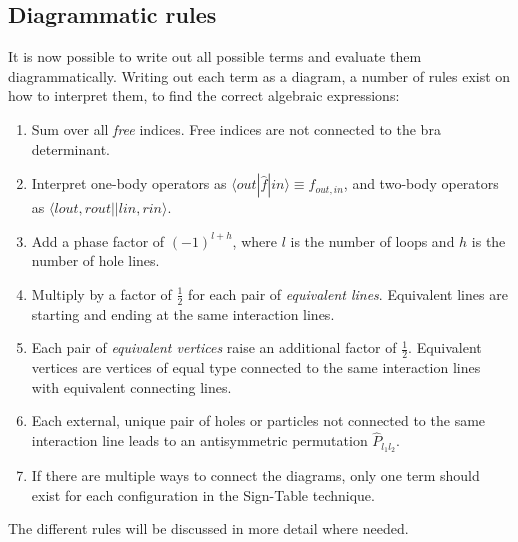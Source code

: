 \subsection{Diagrammatic rules}
It is now possible to write out all possible terms and evaluate them diagrammatically. 
Writing out each term as a diagram, a number of rules exist on how to interpret them, to find the correct algebraic expressions:
\begin{enumerate}
\item\label{ite:CC:sumFree} Sum over all \textit{free} indices. Free indices are not connected to the bra determinant.
\item\label{ite:CC:operators} Interpret one-body operators as $\langle out |\hat{f}| in \rangle \equiv f_{out,in}$, and two-body operators as $\langle lout,rout || lin,rin \rangle$.
\item\label{ite:CC:phase} Add a phase factor of $(-1)^{l+h}$, where $l$ is the number of loops and $h$ is the number of hole lines.
\item\label{ite:CC:equLines} Multiply by a factor of $\frac{1}{2}$ for each pair of \textit{equivalent lines}.
Equivalent lines are starting and ending at the same interaction lines.
\item\label{ite:CC:equVert} Each pair of \textit{equivalent vertices} raise an additional factor of $\frac{1}{2}$.
Equivalent vertices are vertices of equal type connected to the same interaction lines with equivalent connecting lines.
\item\label{ite:CC:permut} Each external, unique pair of holes or particles not connected to the same interaction line leads to an antisymmetric permutation $\hat{P}_{l_1 l_2}$.
\item\label{ite:CC:signTable} If there are multiple ways to connect the diagrams, only one term should exist for each configuration in the Sign-Table technique.
\end{enumerate}
The different rules will be discussed in more detail where needed.

